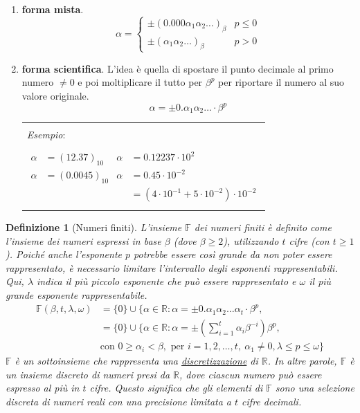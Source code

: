 \documentclass{article}
\newtheorem*{definition}{\color{red}\textbf{Definizione}}
\numberwithin{equation}{section}
\newenvironment{example}
{\begin{center}
        \begin{tabular}{|p{0.9\textwidth}|}
            \hline \\ 
            \textit{Esempio}: \\\\ 
        }
        {
            \\\\ \hline
        \end{tabular}
    \end{center}
}
\begin{document}
\begin{enumerate}
    \item \textbf{forma mista}.
        $$\alpha=\begin{cases}
            \pm(0.000\alpha_1\alpha_2\ldots)_\beta & p\leq 0\\
            \pm(\alpha_1\alpha_2\ldots)_\beta & p>0
        \end{cases}$$
    \item \textbf{forma scientifica}. L'idea è quella di spostare il punto decimale al primo numero $\neq 0$ e
        poi moltiplicare il tutto per $\beta^p$ per riportare il numero al suo valore originale.
        $$\alpha=\pm0.\alpha_1\alpha_2\ldots\cdot\beta^p$$
        \begin{example}
            \begin{equation*}
               \begin{aligned}
                   \alpha&=(12.37)_{10} & \alpha&=0.12237\cdot 10^2 \\
                   \alpha&=(0.0045)_{10} & \alpha&=0.45\cdot 10^{-2} \\ 
                         & & &=(4\cdot 10^{-1}+5\cdot 10^{-2})\cdot 10^{-2}
               \end{aligned} 
            \end{equation*}
        \end{example}
\end{enumerate}
\begin{definition}[Numeri finiti]
    L'insieme $\mathbb{F}$ dei numeri finiti è definito come l'insieme dei numeri espressi in base $\beta$
    (dove $\beta\geq 2$), utilizzando $t$ cifre (con $t\geq 1$). Poiché anche l'esponente $p$
    potrebbe essere così grande da non poter essere rappresentato, è necessario limitare
    l'intervallo degli esponenti rappresentabili. Qui, $\lambda$ indica il più piccolo esponente che
    può essere rappresentato e $\omega$ il più grande esponente rappresentabile.
    \begin{equation*}
        \begin{aligned}
            \mathbb{F}(\beta,t,\lambda,\omega)&=\{0\}\cup\{\alpha\in\mathbb{R}:\alpha=\pm0.\alpha_1\alpha_2\ldots\alpha_t\cdot\beta^p, \\
                              &=\{0\}\cup\{\alpha\in\mathbb{R}:\alpha=\pm(\sum_{i=1}^{t}\alpha_i\beta^{-i})\beta^p, \\ 
                              &\text{con } 0\geq\alpha_i<\beta, \text{ per }i=1,2,\ldots,t,\ \alpha_1\neq 0, \lambda\leq p\leq \omega\}
        \end{aligned}
    \end{equation*}
    $\mathbb{F}$ è un sottoinsieme che rappresenta una \underline{discretizzazione} di $\mathbb{R}$. In altre parole,
    $\mathbb{F}$ è un insieme discreto di numeri presi da $\mathbb{R}$, dove ciascun numero può essere espresso al più in $t$
    cifre. Questo significa che gli elementi di $\mathbb{F}$ sono una selezione discreta di numeri reali con una
    precisione limitata a $t$ cifre decimali.
\end{definition}
\end{document}
